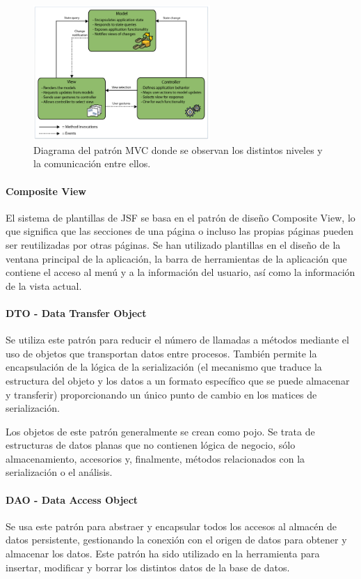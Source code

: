 \begin{figure}[H]
  \centering
  \includegraphics[width=0.6\textwidth]{imaxes/mvc-patron.png}
  \caption{Diagrama del patrón MVC donde se observan los distintos niveles y la comunicación entre ellos.}
  \label{fig:patron-mvc}
\end{figure}




    
\paragraph{Composite View}
El sistema de plantillas de JSF se basa en el patrón de diseño Composite View,
lo que significa que las secciones de una página o incluso las propias páginas pueden ser reutilizadas por otras páginas.
Se han utilizado plantillas en el diseño de la ventana principal de la aplicación, la barra de herramientas de la aplicación que contiene el acceso al menú y a la información del usuario, así como la información de la vista actual.


\paragraph{DTO - Data Transfer Object}
Se utiliza este patrón para reducir el número de llamadas a métodos mediante el uso de objetos que transportan datos entre procesos. También permite la encapsulación de la lógica de la serialización (el mecanismo que traduce la estructura del objeto y los datos a un formato específico que se puede almacenar y transferir) proporcionando un único punto de cambio en los matices de serialización.

Los objetos de este patrón generalmente se crean como \acrlong{pojo}. Se trata de estructuras de datos planas que no contienen lógica de negocio, sólo  almacenamiento, accesorios y, finalmente, métodos relacionados con la serialización o el análisis.


\paragraph{DAO - Data Access Object}
Se usa este patrón para abstraer y encapsular todos los accesos al almacén de datos persistente, gestionando la conexión con el origen de datos para obtener y almacenar los datos. 
Este patrón ha sido utilizado en la herramienta para insertar, modificar y borrar los distintos datos de la base de datos.



